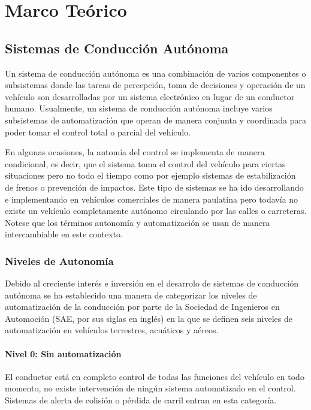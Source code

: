 \chapter{Marco Teórico} \label{ch:m_teorico}

\section{Sistemas de Conducción Autónoma}
Un sistema de conducción autónoma es una combinación de varios componentes o subsistemas donde las tareas 
de percepción, toma de decisiones y operación de un vehículo son desarrolladas por un sistema electrónico en lugar
de un conductor humano. Usualmente, un sistema de conducción autónoma incluye varios subsistemas de automatización 
que operan de manera conjunta y coordinada para poder tomar el control total o parcial del vehículo. 

En algunas ocasiones, la automía del control se implementa de manera condicional, es decir, que el sistema toma 
el control del vehículo para ciertas situaciones pero no todo el tiempo como por ejemplo sistemas de estabilización 
de frenos o prevención de impactos. Este tipo de sistemas se ha ido desarrollando e implementando en vehículos comerciales 
de manera paulatina pero todavía no existe un vehículo completamente autónomo circulando por las calles o carreteras. Notese
que los términos autonomía y automatización se usan de manera intercambiable en este contexto.

    \subsection{Niveles de Autonomía}
    Debido al creciente interés e inversión en el desarrolo de sistemas de conducción autónoma se ha establecido 
    una manera de categorizar los niveles de automatización de la conducción por parte de  la Sociedad de Ingenieros en Automoción
    (SAE, por sus siglas en inglés) en la que se definen seis niveles de automatización en vehículos terrestres, acuáticos y aéreos.

        \subsubsection{Nivel 0: Sin automatización}
        El conductor está en completo control de todas las funciones del vehículo en todo momento, no existe intervención 
        de ningún sistema automatizado en el control. Sistemas de alerta de colisión o pérdida de carril entran en esta categoría.
